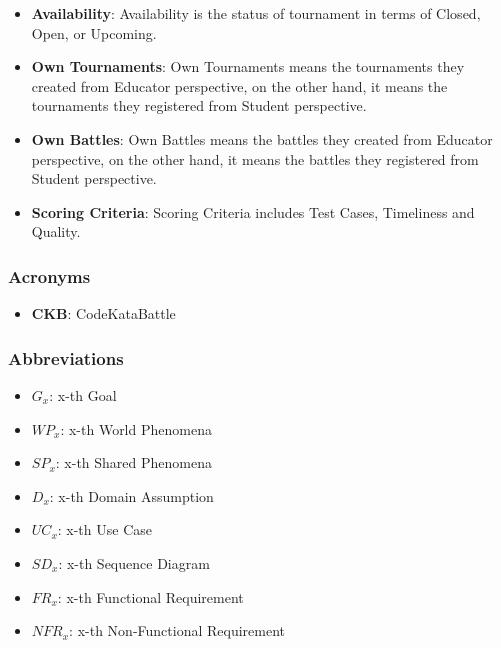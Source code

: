 \begin{itemize}
    \item \textbf{Availability}: Availability is the status of tournament in terms of Closed, Open, or Upcoming.
    \item \textbf{Own Tournaments}: Own Tournaments means the tournaments they created from  Educator perspective, on the other hand, it means the tournaments they registered from  Student perspective.
    \item \textbf{Own Battles}: Own Battles means the battles they created from  Educator perspective, on the other hand, it means the battles they registered from  Student perspective.
    \item \textbf{Scoring Criteria}: Scoring Criteria includes Test Cases, Timeliness and Quality.
    

\end{itemize}

\subsubsection{Acronyms}
\begin{itemize}
    \item \textbf{CKB}: CodeKataBattle
\end{itemize}

\subsubsection{Abbreviations}
\begin{itemize}
    \item $G_{x}$: x-th Goal
    \item $WP_{x}$: x-th World Phenomena
    \item $SP_{x}$: x-th Shared Phenomena
    \item $D_{x}$: x-th Domain Assumption
    \item $UC_{x}$: x-th Use Case
    \item $SD_{x}$: x-th Sequence Diagram
    \item $FR_{x}$: x-th Functional Requirement
    \item $NFR_{x}$: x-th Non-Functional Requirement
\end{itemize}